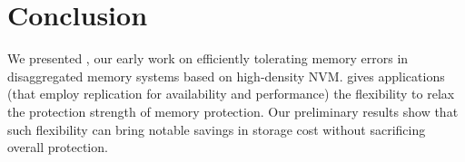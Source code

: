 \section{Conclusion}
We presented \ramp, our early work on efficiently tolerating memory errors in disaggregated memory systems based on high-density NVM.
\ramp gives applications (that employ replication for availability and performance) the flexibility to relax the protection strength of memory protection.
Our preliminary results show that such flexibility can bring notable savings in storage cost without sacrificing overall protection.



